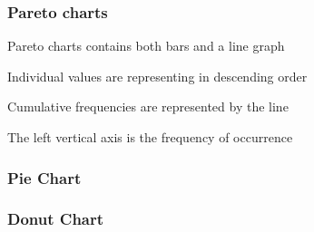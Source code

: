 \documentclass[12pt]{beamer}\usepackage[]{graphicx}\usepackage[]{color}
\makeatletter
\newenvironment{kframe}{%
 \def\at@end@of@kframe{}%
 \ifinner\ifhmode%
  \def\at@end@of@kframe{\end{minipage}}%
  \begin{minipage}{\columnwidth}%
 \fi\fi%
 \def\FrameCommand##1{\hskip\@totalleftmargin \hskip-\fboxsep
 \colorbox{shadecolor}{##1}\hskip-\fboxsep
     \hskip-\linewidth \hskip-\@totalleftmargin \hskip\columnwidth}%
 \MakeFramed {\advance\hsize-\width
   \@totalleftmargin\z@ \linewidth\hsize
   \@setminipage}}%
 {\par\unskip\endMakeFramed%
 \at@end@of@kframe}
\newenvironment{knitrout}{}{} %
\makeatother
\begin{document}

\begin{frame}
\frametitle{Pareto charts}
\bbi
  \item Pareto charts contains both bars and a line graph
  \item Individual values are representing in descending order
  \item Cumulative frequencies are represented by the line
  \item The left vertical axis is the frequency of occurrence
\ei
\end{frame}


\begin{frame}
\begin{center}
\Huge{}
\end{center}
\end{frame}


\begin{frame}[fragile]
\frametitle{Pie Chart}

\begin{knitrout}\footnotesize
{}\color{fgcolor}\begin{kframe}


{\ttfamily\noindent\bfseries\color{errorcolor}{\#\# Error in pie(hues, col = names(hues)): object 'hues' not found}}\end{kframe}
\end{knitrout}

\end{frame}


\begin{frame}[fragile]
\frametitle{Donut Chart}

\begin{knitrout}\footnotesize
{}\color{fgcolor}\begin{kframe}


{\ttfamily\noindent\bfseries\color{errorcolor}{\#\# Error in pie(hues, col = names(hues)): object 'hues' not found}}

{\ttfamily\noindent\bfseries\color{errorcolor}{\#\# Error in plot.xy(xy.coords(x, y), type = type, ...): plot.new has not been called yet}}\end{kframe}
\end{knitrout}

\end{frame}
\end{document}

